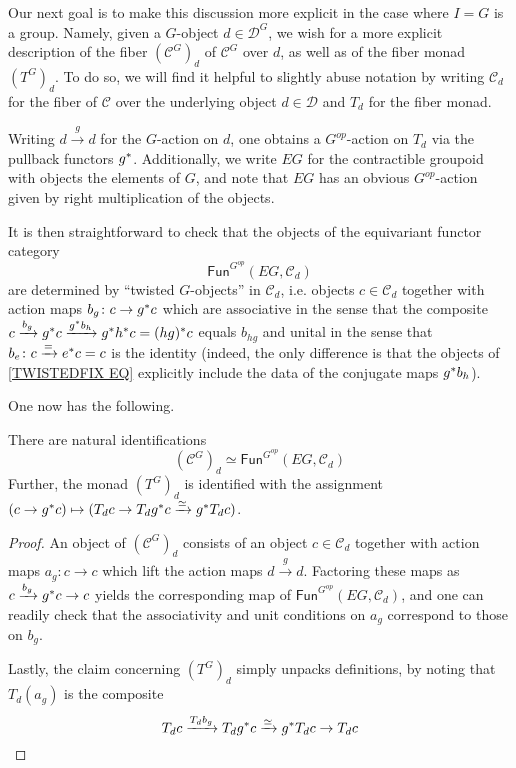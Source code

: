 \documentclass[a4paper,10pt
,draft
]{article}%
\renewcommand{\1}{\eta}%
\begin{document}
Our next goal is to make this discussion more explicit in the case where
$I=G$ is a group.
Namely, given a $G$-object $d \in \mathcal{D}^G$,
we wish for a more explicit description of the fiber
$\left(\mathcal{C}^G\right)_d$ of $\mathcal{C}^G$ over $d$,
as well as of the fiber monad $(T^G)_d$.
To do so, we will find it helpful to slightly abuse notation by writing $\mathcal{C}_d$ for the fiber of $\mathcal{C}$ over the underlying object $d \in \mathcal{D}$ and $T_d$ for the fiber monad.

Writing $d\xrightarrow{g} d$ for the $G$-action on $d$, one obtains a  $G^{op}$-action on $T_d$ via the pullback functors $g^{\**}$.
Additionally, we write $EG$ for the contractible groupoid with objects the elements of $G$, and note that $EG$ has an obvious 
$G^{op}$-action given by right multiplication of the objects.

It is then straightforward to check that the objects of the equivariant functor category
\begin{equation}\label{TWISTEDFIX EQ}
\mathsf{Fun}^{G^{op}}(EG,\mathcal{C}_d)
\end{equation}
are determined by ``twisted $G$-objects'' in $\mathcal{C}_d$, i.e. objects 
$c\in \mathcal{C}_d$
together with action maps 
$b_g \colon c \to g^{\**}c$
which are associative in the sense that the composite
$c \xrightarrow{b_g} g^{\**}c \xrightarrow{g^{\**}b_h} g^{\**} h^{\**} c = (hg)^{\**}c$ equals $b_{hg}$
and unital in the sense that
$b_e \colon c \xrightarrow{=} e^{\**}c = c$
is the identity
(indeed, the only difference is that the
objects of \ref{TWISTEDFIX EQ} explicitly include the data
of the conjugate maps $g^{\**}b_h$).

One now has the following.



\begin{proposition}
There are natural identifications
\[
\left(\mathcal{C}^G\right)_d \simeq
\mathsf{Fun}^{G^{op}}(EG,\mathcal{C}_d)
\]
Further, the monad $\left(T^G\right)_d$
is identified with the assignment
$(c \to g^{\**}c) \mapsto 
(T_d c \to T_dg^{\**}c \xrightarrow{\simeq} g^{\**}T_d c)$.
\end{proposition}



\begin{proof}
An object of $\left(\mathcal{C}^G\right)_d$
consists of an object $c \in \mathcal{C}_d$ together with action maps
$a_g\colon c \to c$ which lift the action maps $d \xrightarrow{g} d$.
Factoring these maps
as $c \xrightarrow{b_g} g^{\**}c \to c$
yields the corresponding map of $\mathsf{Fun}^{G^{op}}(EG,\mathcal{C}_d)$,
and one can readily check that the associativity and unit conditions on $a_g$ correspond to those on $b_g$.

Lastly, the claim concerning $\left(T^G\right)_d$ simply unpacks definitions, by noting that
$T_d(a_g)$ is the composite
\[
T_d c \xrightarrow{T_d b_g}
T_d g^{\**} c \xrightarrow{\simeq} 
g^{\**} T_d c  \to T_d c 
\]
\end{proof}
\end{document}

